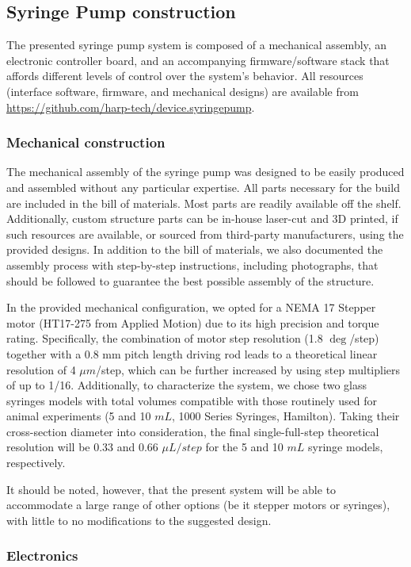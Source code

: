 \subsection*{Syringe Pump construction}
The presented syringe pump system is composed of a mechanical assembly, an electronic controller board, and an accompanying firmware/software stack that affords different levels of control over the system's behavior. 
All resources (interface software, firmware, and mechanical designs) are available from \url{https://github.com/harp-tech/device.syringepump}.

\subsubsection*{Mechanical construction}
The mechanical assembly of the syringe pump was designed to be easily produced and assembled without any particular expertise. All parts necessary for the build are included in the bill of materials. Most parts are readily available off the shelf. Additionally, custom structure parts can be in-house laser-cut and 3D printed, if such resources are available, or sourced from third-party manufacturers, using the provided designs. In addition to the bill of materials, we also documented the assembly process with step-by-step instructions, including photographs, that should be followed to guarantee the best possible assembly of the structure.

In the provided mechanical configuration, we opted for a NEMA 17 Stepper motor (HT17-275 from Applied Motion) due to its high precision and torque rating. Specifically, the combination of motor step resolution (1.8 $\deg$/step) together with a 0.8 mm pitch length driving rod leads to a theoretical linear resolution of 4 $\mu m$/step, which can be further increased by using step multipliers of up to 1/16.
Additionally, to characterize the system, we chose two glass syringes models with total volumes compatible with those routinely used for animal experiments (5 and 10 $mL$, 1000 Series Syringes, Hamilton). Taking their cross-section diameter into consideration, the final single-full-step theoretical resolution will be 0.33 and 0.66 $\mu L / step$ for the 5 and 10 $mL$ syringe models, respectively.

It should be noted, however, that the present system will be able to accommodate a large range of other options (be it stepper motors or syringes), with little to no modifications to the suggested design.

\subsubsection*{Electronics}

